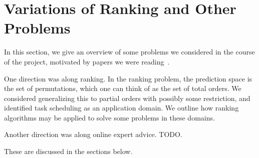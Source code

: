 \section{Variations of Ranking and Other Problems}
In this section, we give an overview of some problems we considered in the
course of the project, motivated by papers we were reading~\cite{}. 

One direction was along ranking. In the ranking problem, the prediction space
is the set of permutations, which one can think of as the set of total orders.
We considered generalizing this to partial orders with possibly some
restriction, and identified task scheduling as an application domain.
We outline how ranking algorithms may be applied to solve some
problems in these domains.

Another direction was along online expert advice.
TODO.

These are discussed in the sections below.
